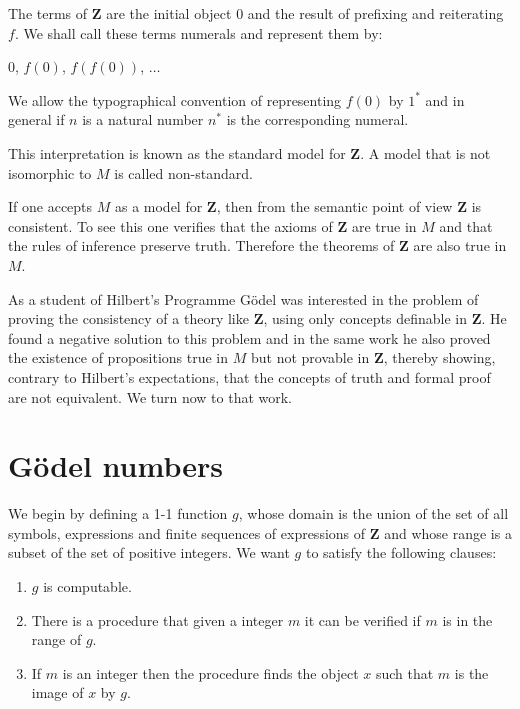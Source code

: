\documentclass[12pt]{article}
\begin{document}
The terms of $\textbf{Z}$ are the initial object 0 and the result of prefixing and reiterating $f$. We  shall  call these terms numerals and represent them by:

\begin{center}
0, $f (0)$, $f (f (0))$, $\ldots$
\end{center}

We allow the typographical convention of representing $f (0)$ by $1^*$ and in general if $n$ is a natural number $n^*$ is the corresponding numeral.

This interpretation is known as the standard model for $\textbf{Z}$. A model that is not isomorphic to $M$ is called non-standard.

If one accepts $M$ as a model for $\textbf{Z}$, then from the semantic point of view $\textbf{Z}$ is consistent. To see this one verifies that the axioms of $\textbf{Z}$ are true in $M$ and that the rules of inference preserve truth. Therefore the theorems of $\textbf{Z}$ are also true in $M$.

As a student of Hilbert's Programme G\"{o}del was interested in the problem of proving the consistency of a theory like $\textbf{Z}$, using only concepts definable in $\textbf{Z}$. He found a negative solution to this problem and in the same work he also proved the existence of propositions true in $M$ but not provable in $\textbf{Z}$, thereby showing, contrary to Hilbert's expectations, that the concepts of truth and formal proof are not equivalent. We turn now to that work. 

\section{G\"{o}del numbers}\normalsize

We begin by defining a 1-1 function $g$, whose domain is the union of the set of all symbols, expressions and finite sequences of expressions of $\textbf{Z}$ and whose range is a subset of the set of positive integers. We want $g$ to satisfy the following clauses:

\begin{enumerate}
\item $g$ is computable.
\item There is a procedure that given a integer $m$ it can be verified if $m$ is in the range of $g$.
\item If $m$ is an integer then the procedure finds the object $x$ such that $m$ is the image of $x$ by $g$.
\end{enumerate}
\end{document}
